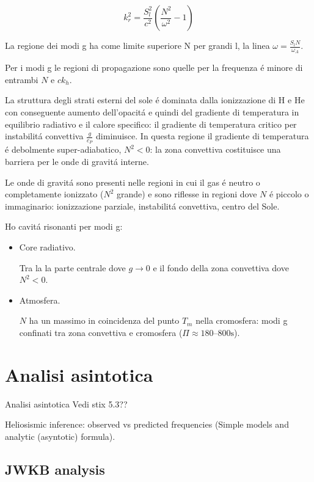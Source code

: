 \documentclass[../main.tex]{subfiles}
\begin{document}
\begin{equation*}
k_r^2=\frac{S_l^2}{c^2}(\frac{N^2}{\omega^2}-1)
\end{equation*}

La regione dei modi g ha come limite superiore N per grandi l, la linea $\omega=\frac{S_lN}{\omega_A}$.

Per i modi g le regioni di propagazione sono quelle per la frequenza \'e minore di entrambi $N$ e $ck_h$.

La struttura degli strati esterni del sole \'e dominata dalla ionizzazione di H e He con conseguente aumento dell'opacit\'a e quindi del gradiente di temperatura in equilibrio radiativo e il calore specifico: il gradiente di temperatura critico per instabilit\'a convettiva $\frac{g}{c_P}$ diminuisce. In questa regione il gradiente di temperatura \'e debolmente super-adiabatico, $N^2<0$: la zona convettiva costituisce una barriera per le onde di gravit\'a interne.

Le onde di gravit\'a sono presenti nelle regioni in cui il gas \'e neutro o completamente ionizzato ($N^2$ grande) e sono riflesse in regioni dove $N$ \'e piccolo o immaginario: ionizzazione parziale, instabilit\'a convettiva, centro del Sole.

Ho cavit\'a risonanti per modi g:
\begin{itemize}
    \item Core radiativo.
    
    Tra la la parte centrale dove $g\to0$ e il fondo della zona convettiva dove $N^2<0$.
    \item Atmosfera.
    
    $N$ ha un massimo in coincidenza del punto $T_m$ nella cromosfera: modi g confinati tra zona convettiva e cromosfera ($\Pi\approx\numrange{180}{800}\si{\second}$).
\end{itemize}


\section{Analisi asintotica}

\begin{todo}{Analisi asintotica}
Vedi stix 5.3??

Heliosismic inference: observed vs predicted frequencies (Simple models and analytic (asyntotic) formula).
\end{todo}

\subsection{JWKB analysis}
\end{document}
